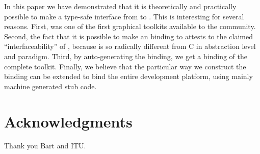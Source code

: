 \documentclass[finalversion]{usetex-v1}
\begin{document}

In this paper we have demonstrated that it is theoretically and
practically possible to make a type-safe interface from \sml to \gtk.
This is interesting for several reasons. First, \mgtk was one of the
first graphical toolkits available to the \sml community. Second, the
fact that it is possible to make an \sml binding to \gtk
attests to the claimed ``interfaceability'' of \gtk, because \sml is so
radically different from C in abstraction level and paradigm. Third,
by auto-generating the binding, we get a binding of the complete \gtk
toolkit. Finally, we believe that the particular way we construct the
binding can be extended to bind the
entire \gnome development platform, using mainly machine generated
stub code.


\section{Acknowledgments}
\label{sec:acknowledgments}

Thank you Bart and ITU.




\end{document}
